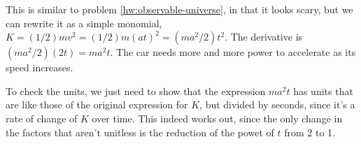 This is similar to problem \ref{hw:observable-universe}, in that it looks scary, but we can rewrite
it as a simple monomial, $K=(1/2)mv^2=(1/2)m(at)^2=(ma^2/2)t^2$. The derivative is
$(ma^2/2)(2t)=ma^2t$. The car needs more and more power to accelerate as its speed increases.

To check the units, we just need to show that the expression $ma^2t$ has units that are like
those of the original expression for $K$, but divided by seconds, since it's a rate of
change of $K$ over time. This indeed works out, since the only change in the factors that
aren't unitless is the reduction of the powet of $t$ from 2 to 1.
